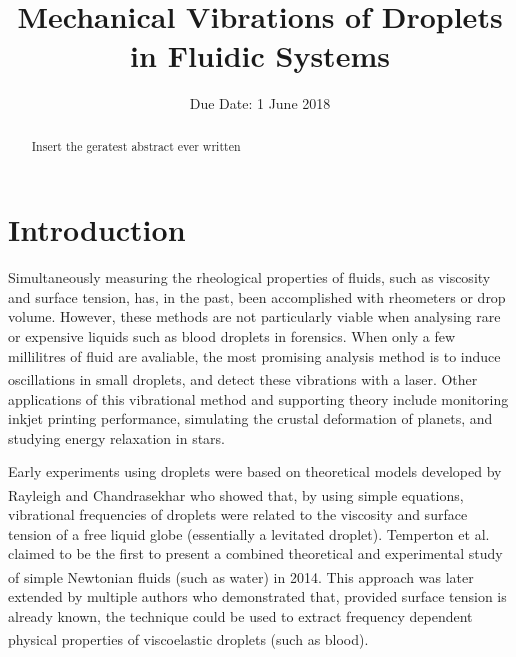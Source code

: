 \documentclass{physics_article_B}
\title{Mechanical Vibrations of Droplets in Fluidic Systems}
\date{Due Date: 1 June 2018}
\begin{document}
	
\setcounter{page}{0}
%

\begin{abstract}
	\large{Insert the geratest abstract ever written 
}
\end{abstract}
	

\tableofcontents

\setcounter{page}{1}
\setlength{\parskip}{6pt}  
\newpage
{} 
\setcounter{page}{1}

\section{Introduction\label{sect:intro}}

    Simultaneously measuring the rheological properties of fluids, such as viscosity and surface tension, has, in the past, been accomplished with rheometers or drop volume. However, these methods are not particularly viable when analysing rare or expensive liquids such as blood droplets in forensics. When only a few millilitres of fluid are avaliable, the most promising analysis method is to induce oscillations in small droplets\textsuperscript{\cite{harrold}}, and detect these vibrations with a laser. Other applications of this vibrational method and supporting theory include monitoring inkjet printing performance\cite{Martin2008}, simulating the crustal deformation of planets\cite{vukasinovic}, and studying energy relaxation in stars\cite{vukasinovic}.
    
    Early experiments using droplets were based on theoretical models developed by Rayleigh\textsuperscript{\cite{rayleigh}} and Chandrasekhar\textsuperscript{\cite{chandrasekhar2}} who showed that, by using simple equations, vibrational frequencies of droplets were related to the viscosity and surface tension of a free liquid globe (essentially a levitated droplet). Temperton et al. claimed to be the first to present a combined theoretical and experimental study of simple Newtonian fluids (such as water) in 2014\textsuperscript{\cite{temperton}}. This approach was later extended by multiple authors who demonstrated that, provided surface tension is already known, the technique could be used to extract frequency dependent physical properties of viscoelastic droplets (such as blood)\textsuperscript{\cite{egry}}. 
    
\end{document}
